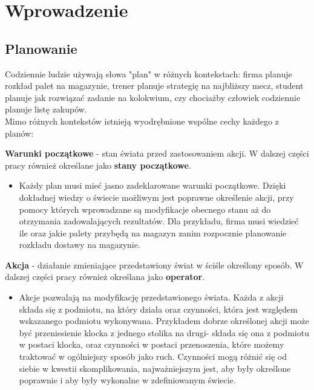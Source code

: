 \chapter{Wprowadzenie}
\thispagestyle{chapterBeginStyle}
\label{rozdzial1}
\section{Planowanie}

    Codziennie ludzie używają słowa "plan" w różnych kontekstach: firma planuje rozkład palet na magazynie, trener planuje strategię na
    najbliższy mecz, student planuje jak rozwiązać zadanie na kolokwium, czy chociażby człowiek codziennie planuje listę zakupów. \\
    Mimo różnych kontekstów istnieją wyodrębnione wspólne cechy każdego z planów:
    \begin{definition}
    \label{StanyPoczatkowe}
        \textbf{Warunki początkowe} - stan świata przed zastosowaniem akcji. W dalszej części pracy również określane jako 
        \textbf{stany początkowe}.
    \end{definition}
    \begin{itemize}
        \item Każdy plan musi mieć jasno zadeklarowane warunki początkowe.
        Dzięki dokładnej wiedzy o świecie możliwym jest poprawne określenie akcji, przy pomocy których wprowadzane są modyfikacje
        obecnego stanu aż do otrzymania zadowalających rezultatów. Dla przykładu, firma musi wiedzieć ile oraz jakie palety 
        przybędą na magazyn zanim rozpocznie planowanie rozkładu dostawy na magazynie.
    \end{itemize}
    \begin{definition}
    \label{Akcje}
        \textbf{Akcja} - działanie zmieniające przedstawiony świat w ściśle określony sposób. W dalszej części pracy również określana jako
        \textbf{operator}.
    \end{definition}
    \begin{itemize}
        \item Akcje pozwalają na modyfikację przedstawionego świata. Każda z akcji składa się z podmiotu, na który działa oraz czynności,
        która jest względem wskazanego podmiotu wykonywana. Przykładem dobrze określonej akcji może być przeniesienie klocka z 
        jednego stolika na drugi- składa się ona z podmiotu w postaci klocka, oraz czynności w postaci przenoszenia, które możemy traktować
        w ogólniejszy sposób jako ruch. Czynności mogą różnić się od siebie w kwestii skomplikowania, najważniejszym jest, aby były określone poprawnie i aby były wykonalne w zdefiniowanym świecie.
    \end{itemize}
